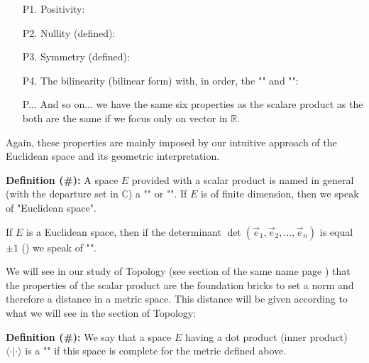 	\begin{enumerate}
		\item[P1.] Positivity: 
		
	  	
	  	\item[P2.] Nullity (defined): 
	  	 
	  	
	  	\item[P3.] Symmetry (defined): 
	  	
	  	
	  	\item[P4.] The bilinearity (bilinear form) with, in order, the "" and "":
	  	
		
		\item[P...] And so on... we have the same six properties as the scalare product as the both are the same if we focus only on vector in $\mathbb{R}$.
	\end{enumerate}
	\begin{tcolorbox}[title=Remark,colframe=black,arc=10pt]
	Again, these properties are mainly imposed by our intuitive approach of the Euclidean space and its geometric interpretation.
	\end{tcolorbox}	
	
	\textbf{Definition (\#\mydef):} A space $E$ provided with a scalar product is named in general (with the departure set in $\mathbb{C}$) a "" or "". If $E$ is of finite dimension, then we speak of "Euclidean space".
	\begin{tcolorbox}[title=Remark,colframe=black,arc=10pt]
	If $E$ is a Euclidean space, then if the determinant $\det(\vec{e}_1,\vec{e}_2,\ldots,\vec{e}_n)$ is equal $\pm 1$ () we speak of "\label{oriented Euclidean space}".
	\end{tcolorbox}	
	
	We will see in our study of Topology (see section of the same name page \pageref{topology}) that the properties of the scalar product are the foundation bricks to set a norm and therefore a distance in a metric space. This distance will be given according to what we will see in the section of Topology:
	
	
	\textbf{Definition (\#\mydef):} We say that a space $E$ having a dot product (inner product) $ \langle \cdot | \cdot \rangle$ is a "" if this space is complete for the metric defined above.
	
